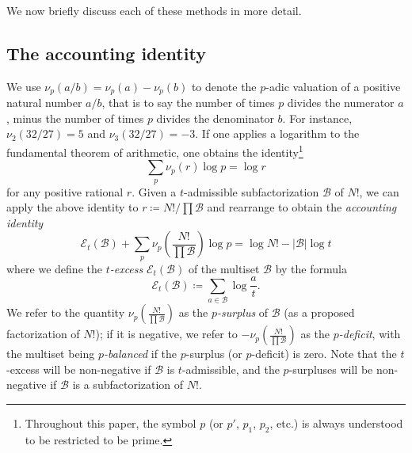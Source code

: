 \documentclass[12pt,a4paper,reqno]{amsart}
\numberwithin{equation}{section}
\theoremstyle{plain}
\theoremstyle{definition}
\newcommand\tuple{{\mathcal B}}
\newcommand\excess{{\mathcal{E}}}
\begin{document}
We now briefly discuss each of these methods in more detail.

\subsection{The accounting identity}

We use $\nu_p(a/b) = \nu_p(a)-\nu_p(b)$ to denote the $p$-adic valuation of a positive natural number $a/b$, that is to say the number of times $p$ divides the numerator $a$, minus the number of times $p$ divides the denominator $b$.  For instance, $\nu_2(32/27)=5$ and $\nu_3(32/27)=-3$. 
If one applies a logarithm to the fundamental theorem of arithmetic, one obtains the identity\footnote{Throughout this paper, the symbol $p$ (or $p'$, $p_1$, $p_2$, etc.) is always understood to be restricted to be prime.}
\begin{equation}\label{ftoa}
  \sum_p \nu_p(r) \log p = \log r
\end{equation}
for any positive rational $r$.  Given a $t$-admissible subfactorization $\tuple$ of $N!$, we can apply the above identity to $r \coloneqq N!/\prod \tuple$ and rearrange to obtain the \emph{accounting identity}
\begin{equation}\label{accounting} 
  \excess_t(\tuple) + \sum_p \nu_p\left( \frac{N!}{\prod \tuple} \right) \log p = \log N! - |\tuple| \log t
\end{equation}
where we define the \emph{$t$-excess} $\excess_t(\tuple)$ of the multiset $\tuple$ by the formula
\begin{equation}\label{excess-def}
  \excess_t(\tuple) \coloneqq \sum_{a \in \tuple} \log \frac{a}{t}.
\end{equation}
We refer to the quantity $\nu_p\left( \frac{N!}{\prod \tuple} \right)$ as the \emph{$p$-surplus} of $\tuple$ (as a proposed factorization of $N!$); if it is negative, we refer to $-\nu_p\left( \frac{N!}{\prod \tuple} \right)$ as the \emph{$p$-deficit}, with the multiset being \emph{$p$-balanced} if the $p$-surplus (or $p$-deficit) is zero.  Note that the $t$-excess will be non-negative if $\tuple$ is $t$-admissible, and the $p$-surpluses will be non-negative if $\tuple$ is a subfactorization of $N!$.  
\end{document}
